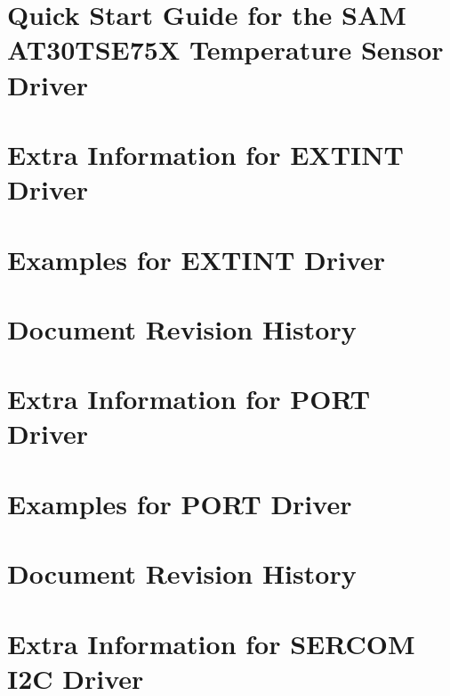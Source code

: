 \let\mypdfximage\pdfximage\def\pdfximage{\immediate\mypdfximage}\documentclass[twoside]{book}
\newcommand{\+}{\discretionary{\mbox{\scriptsize$\hookleftarrow$}}{}{}}
\begin{document}
\chapter{Quick Start Guide for the S\+AM A\+T30\+T\+S\+E75X Temperature Sensor Driver}
\label{asfdoc_sam0_at30tse75x_qs}

\chapter{Extra Information for E\+X\+T\+I\+NT Driver}
\label{asfdoc_sam0_extint_extra}

\chapter{Examples for E\+X\+T\+I\+NT Driver}
\label{asfdoc_sam0_extint_exqsg}

\chapter{Document Revision History}
\label{asfdoc_sam0_extint_document_revision_history}

\chapter{Extra Information for P\+O\+RT Driver}
\label{asfdoc_sam0_port_extra}

\chapter{Examples for P\+O\+RT Driver}
\label{asfdoc_sam0_port_exqsg}

\chapter{Document Revision History}
\label{asfdoc_sam0_port_document_revision_history}

\chapter{Extra Information for S\+E\+R\+C\+OM I2C Driver}
\label{asfdoc_sam0_sercom_i2c_extra_info_page}

\end{document}
